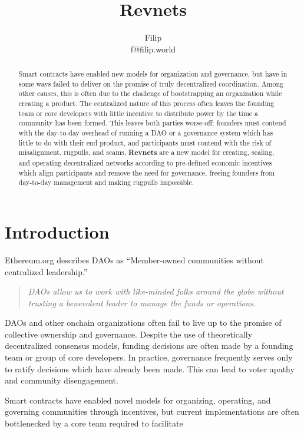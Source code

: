 \documentclass{article}
\title{Revnets}
\author{Filip\\f@filip.world}
\begin{document}
\maketitle

\begin{abstract}
  Smart contracts have enabled new models for organization and governance, but have in some ways failed to deliver on the promise of truly decentralized coordination. Among other causes, this is often due to the challenge of bootstrapping an organization while creating a product. The centralized nature of this process often leaves the founding team or core developers with little incentive to distribute power by the time a community has been formed. This leaves both parties worse-off: founders must contend with the day-to-day overhead of running a DAO or a governance system which has little to do with their end product, and participants must contend with the risk of misalignment, rugpulls, and scams. \textbf{Revnets} are a new model for creating, scaling, and operating decentralized networks according to pre-defined economic incentives which align participants and remove the need for governance, freeing founders from day-to-day management and making rugpulls impossible.
\end{abstract}

\section{Introduction}

Ethereum.org\cite{daos} describes DAOs as ``Member-owned communities without centralized leadership.''

\begin{quote}
  \textit{DAOs allow us to work with like-minded folks around the globe without trusting a benevolent leader to manage the funds or operations.}
\end{quote}

DAOs and other onchain organizations often fail to live up to the promise of collective ownership and governance. Despite the use of theoretically decentralized consensus models, funding decisions are often made by a founding team or group of core developers. In practice, governance frequently serves only to ratify decisions which have already been made. This can lead to voter apathy and community disengagement.

Smart contracts have enabled novel models for organizing, operating, and governing communities through incentives, but current implementations are often bottlenecked by a core team required to facilitate
\end{document}
